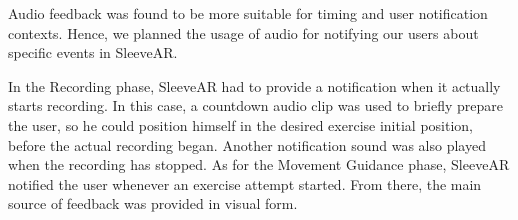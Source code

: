 Audio feedback was found to be more suitable for timing and user notification contexts. 
Hence, we planned the usage of audio for notifying our users about specific events in SleeveAR.

In the Recording phase, SleeveAR had to provide a notification when it actually starts recording. 
In this case, a countdown audio clip was used to briefly prepare the user, so he could
position himself in the desired exercise initial position, before the actual recording began. 
Another notification sound was also played when the recording has stopped.
As for the Movement Guidance phase, SleeveAR notified the user whenever an exercise attempt started. 
From there, the main source of feedback was provided in visual form.